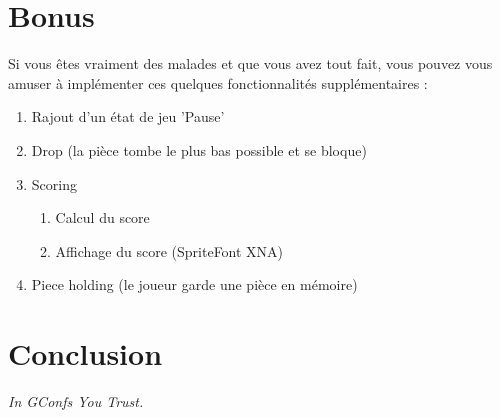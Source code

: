 \documentclass[a4paper]{article}
\begin{document}
\section{Bonus}

Si vous êtes vraiment des malades et que vous avez tout fait, vous pouvez vous
amuser à implémenter ces quelques fonctionnalités supplémentaires :

\begin{enumerate}
    \item Rajout d'un état de jeu 'Pause'
    \item Drop (la pièce tombe le plus bas possible et se bloque)
    \item Scoring
        \begin{enumerate}
            \item Calcul du score
            \item Affichage du score (SpriteFont XNA)
        \end{enumerate}
    \item Piece holding (le joueur garde une pièce en mémoire)
\end{enumerate}

\section{Conclusion}

\emph{In GConfs You Trust.}

%
\end{document}

